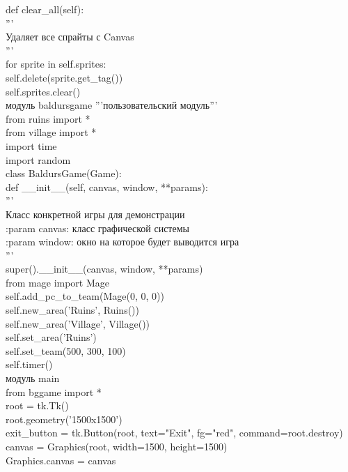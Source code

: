 def clear\_all(self):\\
'''\\
Удаляет все спрайты с Canvas\\

'''\\
for sprite in self.sprites:\\
self.delete(sprite.get\_tag())\\
self.sprites.clear()\\

модуль baldursgame '''пользовательский модуль'''\\

from ruins import *\\
from village import *\\
import time\\
import random\\

class BaldursGame(Game):\\
def \_\_init\_\_(self, canvas, window, **params):\\
'''\\
Класс конкретной игры для демонстрации\\

:param canvas: класс графической системы\\
:param window: окно на которое будет выводится игра\\
'''\\
super().\_\_init\_\_(canvas, window, **params)\\
from mage import Mage\\
self.add\_pc\_to\_team(Mage(0, 0, 0))\\
self.new\_area('Ruins', Ruins())\\
self.new\_area('Village', Village())\\
self.set\_area('Ruins')\\
self.set\_team(500, 300, 100)\\
self.timer()\\

модуль main\\
from bggame import *\\

root = tk.Tk()\\
root.geometry('1500x1500')\\

exit\_button = tk.Button(root, text="Exit", fg="red", command=root.destroy)\\
canvas = Graphics(root, width=1500, height=1500)\\
Graphics.canvas = canvas\\

